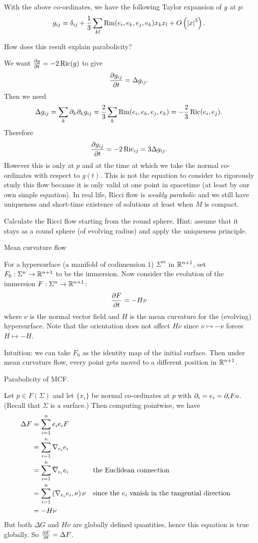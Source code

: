 \begin{thm}
  With the above co-ordinates, we have the following Taylor expansion of $g$ at $p$:
  \[ g_{ij} = \delta_{ij} + \frac13 \sum_{kl} \operatorname{Rm}(e_i,e_k,e_j,e_k)x_kx_l + O \left(\left\lvert x \right\rvert^3 \right). \]
\end{thm}

How does this result explain parabolicity?

We want $\tfrac{\partial g}{\partial t}=-2\operatorname{Ric}(g)$ to give
\[ \frac{\partial g_{ij}}{\partial t} = \Delta g_{ij}. \]
Then we need
\[ \Delta g_{ij} = \sum_{k} \partial_k\partial_kg_{ij} = \frac23 \sum_k \operatorname{Rm}(e_i,e_k,e_j,e_k) = -\frac23\operatorname{Ric}(e_i,e_j). \]
Therefore
\[ \frac{\partial g_{ij}}{\partial t} = -2\operatorname{Ric}_{ij} = 3\Delta g_{ij}. \]
However this is only at $p$ and at the time at which we take the normal co-ordinates with respect to $g(t)$.
This is not the equation to consider to rigorously study this flow because it is only valid at one point in spacetime (at least by our own simple equation).
In real life, Ricci flow is \emph{weakly parabolic} and we still have uniqueness and short-time existence of solutions at least when $M$ is compact.

\begin{exer}
  Calculate the Ricci flow starting from the round sphere.
  Hint: assume that it stays as a round sphere (of evolving radius) and apply the uniqueness principle.
\end{exer}

Mean curvature flow

For a hypersurface (a manifold of codimension $1$) $\Sigma^m$ in $\mathbb{R}^{n+1}$, set $F_0:\Sigma^n\to\mathbb{R}^{n+1}$ to be the immersion.
Now consider the evolution of the immersion $F: \Sigma^n\to\mathbb{R}^{n+1}$:
\[ \frac{\partial F}{\partial t} = -H\nu \]
where $\nu$ is the normal vector field and $H$ is the mean curvature for the (evolving) hypersurface.
Note that the orientation does not affect $H\nu$ since $\nu\mapsto-\nu$ forces $H\mapsto-H$.

Intuition: we can take $F_0$ as the identity map of the initial surface.
Then under mean curvature flow, every point gets moved to a different position in $\mathbb{R}^{n+1}$.

Parabolicity of MCF.

Let $p\in F(\Sigma)$ and let $\{x_i\}$ be normal co-ordinates at $p$ with $\partial_i=e_i=\partial_iFo$.
(Recall that $\Sigma$ is a surface.)
Then computing pointwise, we have
\begin{align*}
  \Delta F &= \sum_{i=1}^n e_ie_iF \\
  &= \sum_{i=1}^n \nabla_{e_i}e_i \\
  &= \sum_{i=1}^n \overline\nabla_{e_i}e_i && \text{the Euclidean connection}  \\
  &= \sum_{i=1}^n \left( \nabla_{e_i}e_i,\nu \right)\nu && \text{since the $e_i$ vanish in the tangential direction} \\
  &= -H\nu
\end{align*}
But both $\Delta G$ and $H\nu$ are globally defined quantities, hence this equation is true globally.
So $\tfrac{\partial F}{\partial t}=\Delta F$.

